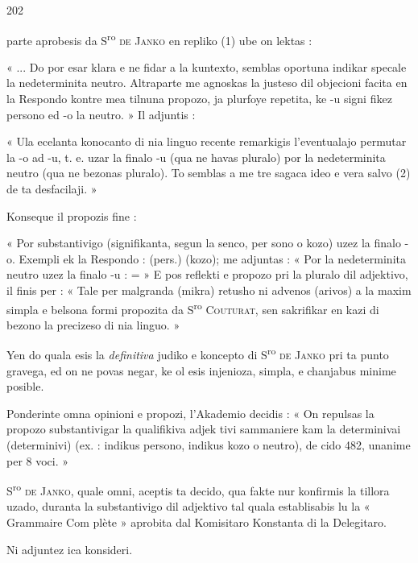 \begin{VUpage}[206]{202}

\VUcontinue
parte aprobesis da S\textsuperscript{ro} \textsc{de Janko} en repliko (1) ube on\nl
lektas :

« ... Do por esar klara e ne fidar a la kuntexto, semblas\nl
oportuna indikar specale la nedeterminita neutro. Altraparte\nl
me agnoskas la justeso dil objecioni facita en la Respondo\nl
kontre mea tilnuna propozo, ja plurfoye repetita, ke -u signi\cc
fikez persono ed -o la neutro. » Il adjuntis :

« Ula ecelanta konocanto di nia linguo recente remarkigis\nl
l'eventualajo permutar la -o ad -u, t. e. uzar la finalo -u\nl
(qua ne havas pluralo) por la nedeterminita neutro (qua\nl
ne bezonas pluralo). To semblas a me tre sagaca ideo e vera\nl
salvo (2) de ta desfacilaji. »

Konseque il propozis fine :

« Por substantivigo (signifikanta, segun la senco, per\cc
sono o kozo) uzez la finalo -o. Exempli ek la Respondo :\nl
{} (pers.)  (kozo); me adjuntas :\nl
{} « Por la nedeterminita neutro uzez la finalo -u :\nl
{} =\nl
{} » E pos reflekti e propozo pri la pluralo dil\nl
adjektivo, il finis per : « Tale per malgranda (mikra)\nl
retusho ni advenos (arivos) a la maxim simpla e belsona\nl
formi propozita da S\textsuperscript{ro} \textsc{Couturat}, sen sakrifikar en kazi di\nl
bezono la precizeso di nia linguo. »

Yen do quala esis la \textit{definitiva} judiko e koncepto di\nl
S\textsuperscript{ro} \textsc{de Janko} pri ta punto gravega, ed on ne povas negar,\nl
ke ol esis injenioza, simpla, e chanjabus minime posible.

Ponderinte omna opinioni e propozi, l'Akademio decidis :\nl
« On repulsas la propozo substantivigar la qualifikiva adjek\cc
tivi sammaniere kam la determinivai (determinivi) (ex. :\nl
{} indikus persono,  indikus kozo o neutro), de\cc
cido 482, unanime per 8 voci. »

S\textsuperscript{ro} \textsc{de Janko}, quale omni, aceptis ta decido, qua fakte nur\nl
konfirmis la tillora uzado, duranta la substantivigo dil\nl
adjektivo tal quala establisabis lu la « Grammaire Com\cc
plète » aprobita dal Komisitaro Konstanta di la Delegitaro.\parplein

Ni adjuntez ica konsideri.
\end{VUpage}

